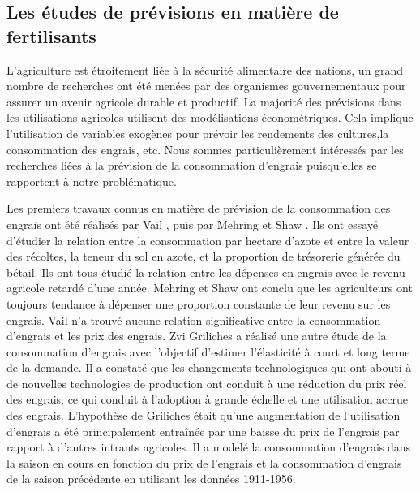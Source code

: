 \subsection{Les études de prévisions en matière de fertilisants}\label{read1}
L'agriculture est étroitement liée à la sécurité alimentaire des nations, un grand nombre de recherches ont été menées par des organismes gouvernementaux pour assurer un avenir agricole durable et productif. La majorité des prévisions dans les utilisations agricoles utilisent des modélisations économétriques. Cela implique l'utilisation de variables exogènes pour prévoir les rendements des cultures,la consommation des engrais, etc. Nous sommes particulièrement intéressés par les recherches liées à la prévision de la consommation d'engrais puisqu'elles se rapportent à notre problématique.\par
Les premiers travaux connus en matière de prévision de la consommation des engrais ont été réalisés par Vail \cite{Vail27}, puis par
Mehring et Shaw \cite{Mehr44}. Ils ont essayé d'étudier la relation entre la consommation par hectare d'azote et entre la valeur des récoltes, la teneur du sol en azote, et la proportion de trésorerie générée
du bétail. Ils ont tous étudié la relation entre les dépenses en engrais avec
le revenu agricole retardé d'une année. Mehring et Shaw ont conclu que les agriculteurs ont toujours tendance à dépenser une proportion constante de leur revenu sur les engrais. Vail n'a trouvé aucune relation significative entre la consommation d'engrais et les prix des engrais.
Zvi Griliches\cite{Zvi58} a réalisé une autre étude de la consommation d'engrais avec l'objectif d'estimer l'élasticité à court et long terme de la demande. Il a constaté que
les changements technologiques qui ont abouti à de nouvelles technologies de production ont conduit à une réduction du prix réel des engrais, ce qui conduit à l'adoption à grande échelle et une utilisation accrue des engrais.
L'hypothèse de Griliches était qu'une augmentation de l'utilisation d'engrais a été principalement entraînée par une baisse du prix de l'engrais par rapport à d'autres intrants agricoles. Il a modelé la consommation d'engrais dans la saison en cours en fonction du prix de l'engrais et la consommation d'engrais de la saison précédente en utilisant les données 1911-1956.\par
